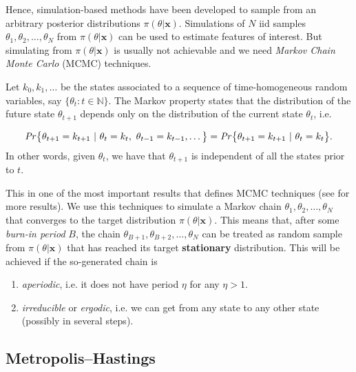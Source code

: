 Hence, simulation-based methods have been developed to sample from an arbitrary posterior distributions $\pi(\theta|\boldsymbol{x})$. Simulations of $N$ iid samples $\theta_1,\theta_2,\dots,\theta_N$ from $\pi(\theta|\boldsymbol{x})$ can be used to estimate features of interest.
But simulating from $\pi(\theta|\boldsymbol{x})$ is usually not achievable and we need \emph{Markov Chain Monte Carlo} (MCMC) techniques. 


\begin{definition}
	Let $k_0,k_1,\dots$ be the states associated to a sequence of time-homogeneous random variables, say $\big\{\theta_t:t\in\mathbb{N}\big\}$.
	The Markov property states that the distribution of the future state $\theta_{t+1}$ depends only on the distribution of the current state $\theta_{t}$,  i.e.
	
	\begin{equation}
	\text{\emph{Pr}}\big\{\theta_{t+1}=k_{t+1}\ |\ \theta_t=k_t,\ \theta_{t-1}=k_{t-1},\dots\big\} = \text{\emph{Pr}}\big\{\theta_{t+1}=k_{t+1}\ | \ \theta_t=k_t\big\}.
	\end{equation}
	In other words, given $\theta_{t}$, we have that $\theta_{t+1}$ is independent of all the states prior to $t$.
\end{definition} 
This in one of the most important results that defines MCMC techniques (see \citet[section 2.2.3]{angelino_patterns_2016} for more results).
We use this techniques to simulate a Markov chain $\theta_1,\theta_2,\dots,\theta_N$ that converges to the target distribution $\pi(\theta|\boldsymbol{x})$.
This means that, after some \emph{burn-in period} $B$, the chain $\theta_{B+1},\theta_{B+2},\ldots,\theta_N$ can be treated as random sample from $\pi(\theta|\boldsymbol{x})$ that has reached its target \textbf{stationary} distribution. 
This will be achieved if the so-generated chain is

\begin{enumerate}
	\item \emph{aperiodic}, i.e. it does not have period $\eta$ for any $\eta>1$.
	\item \emph{irreducible} or \emph{ergodic}, i.e. we can get from any state to any other state (possibly in several steps).
\end{enumerate}




\subsection{Metropolis–Hastings}

